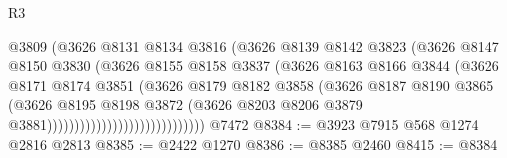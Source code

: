 \begin{lexlean}{R3}
\begin{coremodule}
                                          @3809
                                          (@3626
                                            @8131
                                            @8134
                                            @3816
                                            (@3626
                                              @8139
                                              @8142
                                              @3823
                                              (@3626
                                                @8147
                                                @8150
                                                @3830
                                                (@3626
                                                  @8155
                                                  @8158
                                                  @3837
                                                  (@3626
                                                    @8163
                                                    @8166
                                                    @3844
                                                    (@3626
                                                      @8171
                                                      @8174
                                                      @3851
                                                      (@3626
                                                        @8179
                                                        @8182
                                                        @3858
                                                        (@3626
                                                          @8187
                                                          @8190
                                                          @3865
                                                          (@3626
                                                            @8195
                                                            @8198
                                                            @3872
                                                            (@3626
                                                              @8203
                                                              @8206
                                                              @3879
                                                              @3881)))))))))))))))))))))))))))))
    @7472
@8384 := @3923 @7915 @568 @1274 @2816 @2813
@8385 := @2422 @1270
@8386 := @8385 @2460
@8415 := @8384

\end{coremodule}
\end{lexlean}
